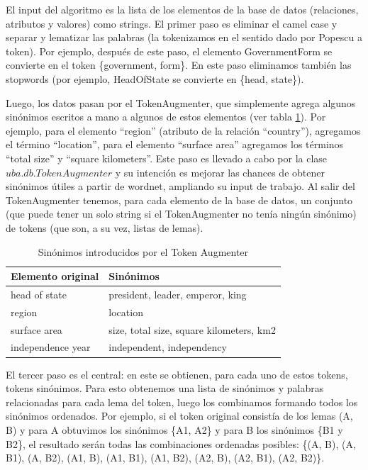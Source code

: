 El input del algoritmo es la lista de los elementos de la base de datos (relaciones, atributos y valores) como strings. El primer paso es eliminar el camel case y separar y lematizar las palabras (la tokenizamos en el sentido dado por Popescu a token). Por ejemplo, después de este paso, el elemento GovernmentForm se convierte en el token \{government, form\}. En este paso eliminamos también las stopwords (por ejemplo, HeadOfState se convierte en \{head, state\}).

Luego, los datos pasan por el TokenAugmenter, que simplemente agrega algunos sinónimos escritos a mano a algunos de estos elementos (ver tabla \ref{table:token-augmenter}). Por ejemplo, para el elemento ``region'' (atributo de la relación ``country''), agregamos el término ``location'', para el elemento ``surface area'' agregamos los términos ``total size'' y ``square kilometers''. Este paso es llevado a cabo por la clase $uba.db.TokenAugmenter$ y su intención es mejorar las chances de obtener sinónimos útiles a partir de wordnet, ampliando su input de trabajo. Al salir del TokenAugmenter tenemos, para cada elemento de la base de datos, un conjunto (que puede tener un solo string si el TokenAugmenter no tenía ningún sinónimo) de tokens (que son, a su vez, listas de lemas).

\begin{center}
\begin{table}[h]
\centering
\begin{tabular}{| l |  p{12cm} |}
\hline
Elemento original & Sinónimos \\ \hline
head of state & president, leader, emperor, king \\ \hline
region & location\\ \hline
surface area & size, total size, square kilometers, km2\\ \hline
independence year & independent, independency\\ \hline
\end{tabular}
\caption{Sinónimos introducidos por el Token Augmenter}
\label{table:token-augmenter}
\end{table}
\end{center}

El tercer paso es el central: en este se obtienen, para cada uno de estos tokens, tokens sinónimos. Para esto obtenemos una lista de sinónimos y palabras relacionadas para cada lema del token, luego los combinamos formando todos los sinónimos ordenados. Por ejemplo, si el token original consistía de los lemas (A, B) y para A obtuvimos los sinónimos \{A1, A2\} y para B los sinónimos \{B1 y B2\}, el resultado serán todas las combinaciones ordenadas posibles: \{(A, B), (A, B1), (A, B2), (A1, B), (A1, B1), (A1, B2), (A2, B), (A2, B1), (A2, B2)\}.


